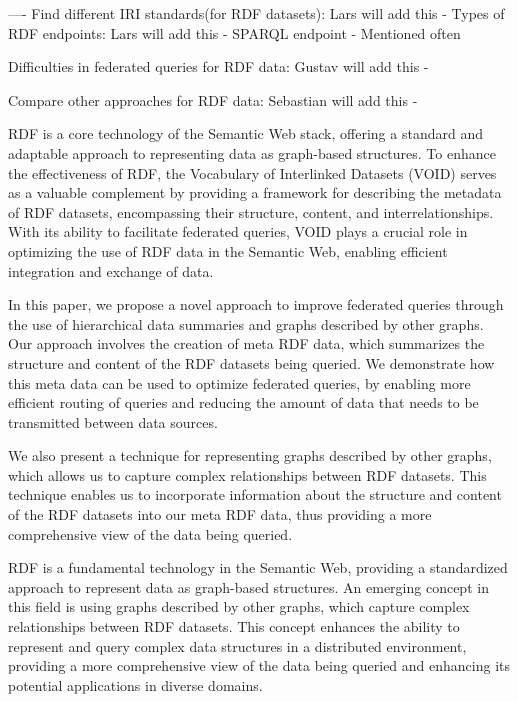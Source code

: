 ----    
Find different IRI standards(for RDF datasets): Lars will add this
    -
Types of RDF endpoints: Lars will add this
    - SPARQL endpoint
        - Mentioned often

Difficulties in federated queries for RDF data: Gustav will add this
    - 

Compare other approaches for RDF data: Sebastian will add this
    - 










RDF is a core technology of the Semantic Web stack, offering a standard and adaptable approach to representing data as graph-based structures. To enhance the effectiveness of RDF, the Vocabulary of Interlinked Datasets (VOID) serves as a valuable complement by providing a framework for describing the metadata of RDF datasets, encompassing their structure, content, and interrelationships. With its ability to facilitate federated queries, VOID plays a crucial role in optimizing the use of RDF data in the Semantic Web, enabling efficient integration and exchange of data.

In this paper, we propose a novel approach to improve federated queries through the use of hierarchical data summaries and graphs described by other graphs. Our approach involves the creation of meta RDF data, which summarizes the structure and content of the RDF datasets being queried. We demonstrate how this meta data can be used to optimize federated queries, by enabling more efficient routing of queries and reducing the amount of data that needs to be transmitted between data sources.

We also present a technique for representing graphs described by other graphs, which allows us to capture complex relationships between RDF datasets. This technique enables us to incorporate information about the structure and content of the RDF datasets into our meta RDF data, thus providing a more comprehensive view of the data being queried.


RDF is a fundamental technology in the Semantic Web, providing a standardized approach to represent data as graph-based structures. An emerging concept in this field is using graphs described by other graphs, which capture complex relationships between RDF datasets. This concept enhances the ability to represent and query complex data structures in a distributed environment, providing a more comprehensive view of the data being queried and enhancing its potential applications in diverse domains.


